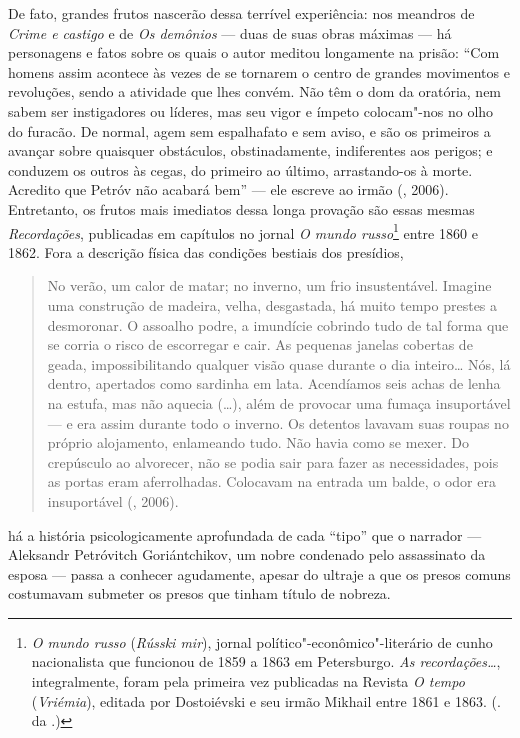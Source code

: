 De fato, grandes frutos nascerão dessa terrível
experiência: nos meandros de \emph{Crime e castigo} e de \emph{Os
demônios} --- duas de suas obras máximas --- há personagens e fatos sobre
os quais o autor meditou longamente na prisão: ``Com homens assim
acontece às vezes de se tornarem o centro de grandes movimentos e
revoluções, sendo a atividade que lhes convém. Não têm o dom da
oratória, nem sabem ser instigadores ou líderes, mas seu vigor e ímpeto
colocam"-nos no olho do furacão. De normal, agem sem espalhafato e sem
aviso, e são os primeiros a avançar sobre quaisquer obstáculos,
obstinadamente, indiferentes aos perigos; e conduzem os outros às cegas,
do primeiro ao último, arrastando-os à morte. Acredito que Petróv não
acabará bem'' --- ele escreve ao irmão (,
2006). Entretanto, os frutos mais imediatos dessa longa provação
são essas mesmas \emph{Recordações}, publicadas em capítulos no
jornal \emph{O mundo russo}\footnote{\emph{O mundo russo}
(\emph{Rússki mir}), jornal político"-econômico"-literário de
cunho nacionalista que funcionou de 1859 a 1863 em Petersburgo.
\emph{As recordações\ldots{}}, integralmente, foram pela primeira
vez publicadas na Revista \emph{O tempo} (\emph{Vriémia}), editada
por Dostoiévski e seu irmão Mikhail entre 1861 e 1863.
(. da .)} entre 1860 e 1862. Fora a descrição física das
condições bestiais dos presídios,

\begin{quotation}
No verão, um calor de matar; no inverno, um frio insustentável.
Imagine uma construção de madeira, velha, desgastada, há muito tempo
prestes a desmoronar. O assoalho podre, a imundície cobrindo tudo de tal
forma que se corria o risco de escorregar e cair. As pequenas janelas
cobertas de geada, impossibilitando qualquer visão quase durante o dia
inteiro\ldots{} Nós, lá dentro, apertados como sardinha em lata. Acendíamos
seis achas de lenha na estufa, mas não aquecia (\ldots{}), além de provocar
uma fumaça insuportável --- e era assim durante todo o inverno. Os
detentos lavavam suas roupas no próprio alojamento, enlameando tudo. Não
havia como se mexer. Do crepúsculo ao alvorecer, não se podia sair para
fazer as necessidades, pois as portas eram aferrolhadas. Colocavam na
entrada um balde, o odor era insuportável (, 2006).
\end{quotation}

há a história psicologicamente aprofundada de cada ``tipo''
que o narrador --- Aleksandr Petróvitch Goriántchikov, um nobre
condenado pelo assassinato da esposa --- passa a conhecer agudamente, apesar do ultraje a que os presos comuns costumavam submeter os presos que tinham título de nobreza.

